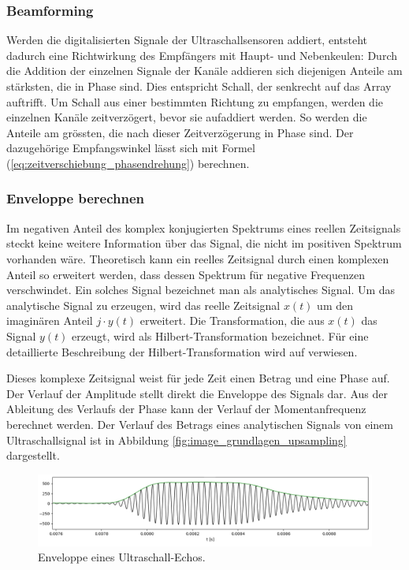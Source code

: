 \subsubsection{Beamforming}\label{sec:beamforming}
Werden die digitalisierten Signale der Ultraschallsensoren addiert, entsteht dadurch eine Richtwirkung des Empfängers mit Haupt- und Nebenkeulen: Durch die Addition der einzelnen Signale der Kanäle addieren sich diejenigen Anteile am stärksten, die in Phase sind. Dies entspricht Schall, der senkrecht auf das Array auftrifft. Um Schall aus einer bestimmten Richtung zu empfangen, werden die einzelnen Kanäle zeitverzögert, bevor sie aufaddiert werden. So werden die Anteile am grössten, die nach dieser Zeitverzögerung in Phase sind. Der dazugehörige Empfangswinkel lässt sich mit Formel (\ref{eq:zeitverschiebung_phasendrehung}) berechnen.

\subsubsection{Enveloppe berechnen}\label{sec:enveloppe_berechnen}
Im negativen Anteil des komplex konjugierten Spektrums eines reellen Zeitsignals steckt keine weitere Information über das Signal, die nicht im positiven Spektrum vorhanden wäre. Theoretisch kann ein reelles Zeitsignal durch einen komplexen Anteil so erweitert werden, dass dessen Spektrum für negative Frequenzen verschwindet. Ein solches Signal bezeichnet man als analytisches Signal.
Um das analytische Signal zu erzeugen, wird das reelle Zeitsignal $x(t)$ um den imaginären Anteil $j \cdot y(t)$ erweitert. Die Transformation, die aus $x(t)$ das Signal $y(t)$ erzeugt, wird als Hilbert-Transformation bezeichnet. Für eine detaillierte Beschreibung der Hilbert-Transformation wird auf \cite{MEYER} verwiesen.

Dieses komplexe Zeitsignal weist für jede Zeit einen Betrag und eine Phase auf. Der Verlauf der Amplitude stellt direkt die Enveloppe des Signals dar. Aus der Ableitung des Verlaufs der Phase kann der Verlauf der Momentanfrequenz berechnet werden. Der Verlauf des Betrags eines analytischen Signals von einem Ultraschallsignal ist in Abbildung \ref{fig:image_grundlagen_upsampling} dargestellt.

\begin{figure}[htb]
\begin{center}
\includegraphics[width=\textwidth]{graphics/image_grundlagen_enveloppe.png}
\end{center}
\caption{Enveloppe eines  Ultraschall-Echos.} %
\label{fig:image_grundlagen_enveloppe}
\end{figure}
%

